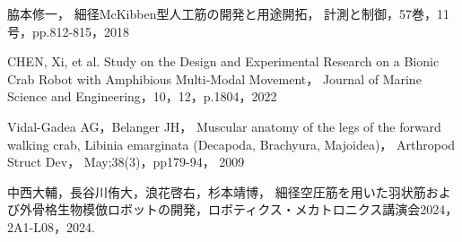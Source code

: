 \documentclass{jarticle}
\begin{document}
\begin{thebibliography}{99}

  脇本修一，
  細径McKibben型人工筋の開発と用途開拓，
  計測と制御，57巻，11号，pp.812-815，2018
  
  CHEN, Xi, et al. Study on the Design and Experimental Research on a Bionic Crab Robot with Amphibious Multi-Modal Movement， Journal of Marine Science and Engineering，10，12，p.1804，2022
  
  Vidal-Gadea AG，Belanger JH， Muscular anatomy of the legs of the forward walking crab, Libinia emarginata (Decapoda, Brachyura, Majoidea)， Arthropod Struct Dev， May;38(3)，pp179-94， 2009
  
  中西大輔，長谷川侑大，浪花啓右，杉本靖博，
  細径空圧筋を用いた羽状筋および外骨格生物模倣ロボットの開発，ロボティクス・メカトロニクス講演会2024，2A1-L08，2024.

  
  
 \end{thebibliography}
\end{document}
